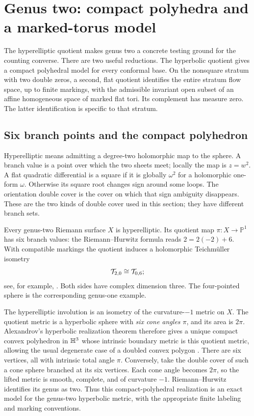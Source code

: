 \section{Genus two: compact polyhedra and a marked-torus model}
\label{sec:genus2markedtorus}

The hyperelliptic quotient makes genus two a concrete testing ground
for the counting converse.  There are two useful reductions.  The
hyperbolic quotient gives a compact polyhedral model for every
conformal base.  On the nonsquare stratum with two double zeros,
a second, flat quotient identifies the entire stratum flow space, up to
finite markings, with the admissible invariant open subset of an affine
homogeneous space of marked flat tori. Its complement has measure zero.
The latter identification is specific to that stratum.

\subsection{Six branch points and the compact polyhedron}
\label{subsec:genus2compact}

Hyperelliptic means admitting a degree-two holomorphic map to the
sphere. A branch value is a point over which the two sheets meet;
locally the map is $z=w^2$. A flat quadratic differential is a
square if it is globally $\omega^2$ for a holomorphic one-form
$\omega$. Otherwise its square root changes sign around some
loops. The orientation double cover is the cover on which that
sign ambiguity disappears. These are the two kinds of double
cover used in this section; they have different branch sets.

Every genus-two Riemann surface $X$ is hyperelliptic.  Its quotient
map $\pi:X\to\mathbb P^1$ has six branch values: the
Riemann--Hurwitz formula reads $2=2(-2)+6$.  With compatible
markings the quotient induces a holomorphic Teichm\"uller isometry
\[
 \mathcal T_{2,0}\cong\mathcal T_{0,6};
\]
see, for example, \cite[Corollary~1.2(3)]{BenirschkeServan}.
Both sides have complex dimension three.  The four-pointed sphere
is the corresponding genus-one example.

The hyperelliptic involution is an isometry of the curvature-$-1$
metric on $X$.  The quotient metric is a hyperbolic sphere with
\emph{six cone angles $\pi$}, and its area is $2\pi$.
Alexandrov's hyperbolic realization theorem therefore gives a
unique compact convex polyhedron in $\mathbb H^3$ whose intrinsic
boundary metric is this quotient metric, allowing the usual
degenerate case of a doubled convex polygon
\cite[Theorem~1.1]{FillastreIzmestievCusps}.
There are six vertices, all with intrinsic total angle $\pi$.
Conversely, take the double cover of such a cone sphere branched at
its six vertices.  Each cone angle becomes $2\pi$, so the lifted
metric is smooth, complete, and of curvature $-1$.  Riemann--Hurwitz
identifies its genus as two.  Thus this compact-polyhedral
realization is an exact model for the genus-two hyperbolic metric,
with the appropriate finite labeling and marking conventions.

